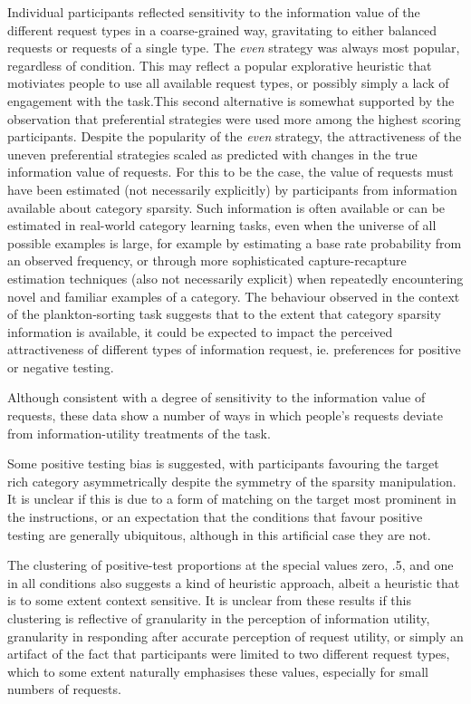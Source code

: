\documentclass[10pt,letterpaper]{article}
\begin{document}
Individual participants reflected sensitivity to the information value of the different request types in a coarse-grained way, gravitating to either balanced requests or requests of a single type. The \textit{even} strategy was always most popular, regardless of condition. This may reflect a popular explorative heuristic that motiviates people to use all available request types, or possibly simply a lack of engagement with the task.This second alternative is somewhat supported by the observation that preferential strategies were used more among the highest scoring participants. Despite the popularity of the \textit{even} strategy, the attractiveness of the uneven preferential strategies scaled as predicted with changes in the true information value of requests. For this to be the case, the value of requests must have been estimated (not necessarily explicitly) by participants from information available about category sparsity. Such information is often available or can be estimated in real-world category learning tasks, even when the universe of all possible examples is large, for example by estimating a base rate probability from an observed frequency, or through more sophisticated capture-recapture estimation techniques %
(also not necessarily explicit) when repeatedly encountering novel and familiar examples of a category.%
The behaviour observed in the context of the plankton-sorting task suggests that to the extent that category sparsity information is available, it could be expected to impact the perceived attractiveness of different types of information request, ie. preferences for positive or negative testing.

Although consistent with a degree of sensitivity to the information value of requests, these data show a number of ways in which people's requests deviate from information-utility treatments of the task. 

Some positive testing bias is suggested, with participants favouring the target rich category asymmetrically despite the symmetry of the sparsity manipulation. It is unclear if this is due to a form of matching \cite{evans1998matching} on the target most prominent in the instructions, or an expectation that the conditions that favour positive testing are generally ubiquitous, although in this artificial case they are not.

The clustering of positive-test proportions at the special values zero, .5, and one in all conditions also suggests a kind of heuristic approach, albeit a heuristic that is to some extent context sensitive. It is unclear from these results if this clustering is reflective of granularity in the perception of information utility, granularity in responding after accurate perception of request utility, or simply an artifact of the fact that participants were limited to two different request types, which to some extent naturally emphasises these values, especially for small numbers of requests.
\end{document}
